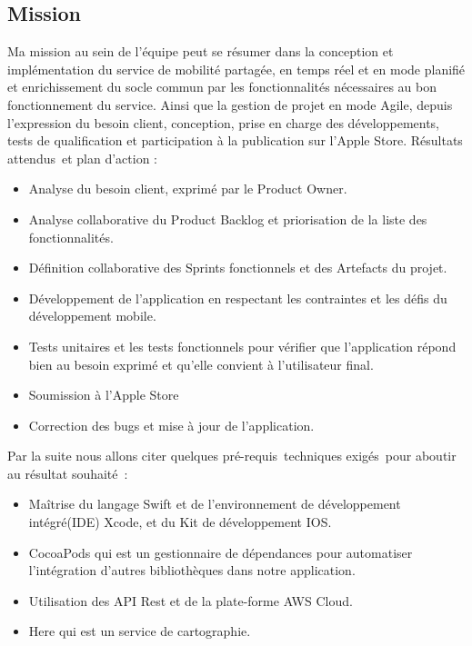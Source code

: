 \subsection{Mission} %
\label{sub:mission}
Ma mission au sein de l’équipe peut se résumer dans la conception et implémentation du service de mobilité partagée, en temps réel et en mode planifié et enrichissement du socle commun par les fonctionnalités nécessaires au bon fonctionnement du service.\newline
Ainsi que la gestion de projet en mode Agile, depuis l’expression du besoin client, conception, prise en charge des développements, tests de qualification et participation à la publication sur l'Apple Store.\newline
Résultats attendus et plan d’action :
\begin{itemize}
	\item Analyse du besoin client, exprimé par le Product Owner.
	\item Analyse collaborative du Product Backlog et priorisation de la liste des fonctionnalités.
	\item Définition collaborative des Sprints fonctionnels et des Artefacts du projet.
	\item Développement de l’application en respectant les contraintes et les défis du développement mobile.
	\item Tests unitaires et les tests fonctionnels
	 pour vérifier que l’application répond bien au besoin exprimé et qu’elle convient à l’utilisateur final.
	\item Soumission à l'Apple Store
	\item Correction des bugs et mise à jour de l’application.
\end{itemize}
Par la suite nous allons citer quelques pré-requis techniques exigés pour aboutir au résultat souhaité :
\begin{itemize}
	\item Maîtrise du langage Swift et de l’environnement de développement intégré(IDE) Xcode, et du Kit de développement IOS.
	\item CocoaPods qui est un gestionnaire de dépendances pour automatiser l’intégration d'autres bibliothèques dans notre application.
	\item Utilisation des API Rest et de la plate-forme AWS Cloud.
	\item Here qui est un service de cartographie.
\end{itemize}

